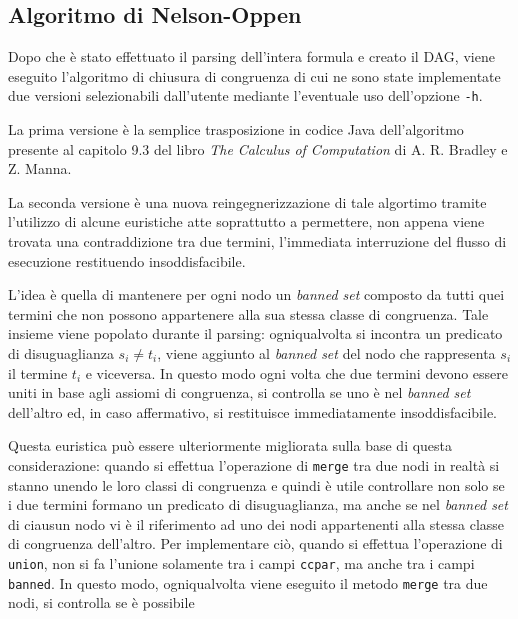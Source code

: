 \documentclass[a4paper,11pt]{article}
\begin{document}
\subsection{Algoritmo di Nelson-Oppen}
Dopo che è stato effettuato il parsing dell'intera formula e creato il 
DAG, viene eseguito l'algoritmo di chiusura di congruenza di cui ne 
sono state implementate due versioni selezionabili dall'utente 
mediante l'eventuale uso dell'opzione \texttt{-h}.\par
La prima versione è la semplice trasposizione in codice Java 
dell'algoritmo presente al capitolo 9.3 del libro \emph{The Calculus 
of Computation} di A. R. Bradley e Z. Manna.\par
La seconda versione è una nuova reingegnerizzazione di tale algortimo 
tramite l'utilizzo di alcune euristiche atte soprattutto a permettere, 
non appena viene trovata una contraddizione tra due termini, l'immediata 
interruzione del flusso di esecuzione restituendo insoddisfacibile.\par
L'idea è quella di mantenere per ogni nodo un \emph{banned set} 
composto da tutti quei termini che non possono appartenere alla sua 
stessa classe di congruenza. Tale insieme viene popolato durante il 
parsing: ogniqualvolta si incontra un predicato di disuguaglianza 
$s_{i} \not= t_{i}$, viene aggiunto al \emph{banned set} del nodo che 
rappresenta $s_{i}$ il termine $t_{i}$ e viceversa. 
In questo modo ogni volta che due termini devono essere uniti in base 
agli assiomi di congruenza, si controlla se uno è nel \emph{banned 
set} dell'altro ed, in caso affermativo, si restituisce immediatamente 
insoddisfacibile. \par
Questa euristica può essere ulteriormente migliorata sulla base di questa 
considerazione: quando si effettua l'operazione di \texttt{merge} tra 
due nodi in realtà si stanno unendo le loro classi di congruenza e quindi 
è utile controllare non solo se i due termini formano un predicato di 
disuguaglianza, ma anche se nel \emph{banned set} di ciausun nodo vi è il 
riferimento ad uno dei nodi appartenenti alla stessa classe di congruenza 
dell'altro. Per implementare ciò, quando si effettua l'operazione di 
\texttt{union}, non si fa l'unione solamente tra i campi \texttt{ccpar}, 
ma anche tra i campi \texttt{banned}. In questo modo, ogniqualvolta 
viene eseguito il metodo \texttt{merge} tra due nodi, si controlla se è possibile 
\end{document}
